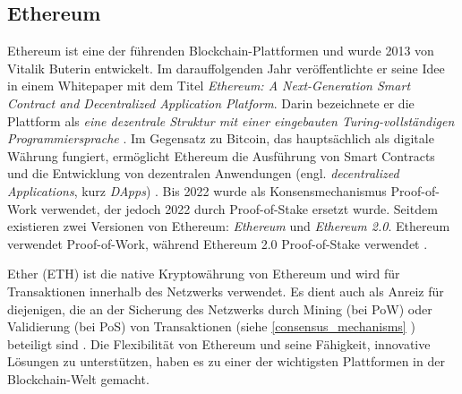 \subsection{Ethereum}
\label{sec:ethereum_basics}

Ethereum ist eine der führenden Blockchain-Plattformen und wurde 2013 von Vitalik Buterin entwickelt. Im darauffolgenden Jahr veröffentlichte er seine Idee in einem Whitepaper mit dem Titel \textit{Ethereum: A Next-Generation Smart Contract and Decentralized Application Platform}. Darin bezeichnete er die Plattform als \textit{eine dezentrale Struktur mit einer eingebauten Turing-vollständigen Programmiersprache} \parencite{Buterin_EthereumWhitepaper}. Im Gegensatz zu Bitcoin, das hauptsächlich als digitale Währung fungiert, ermöglicht Ethereum die Ausführung von Smart Contracts und die Entwicklung von dezentralen Anwendungen (engl. \textit{decentralized Applications}, kurz \textit{DApps}) \Parencites[S. 720]{Sorge_BitcoinZahlungsmittelDerZukunft}[S. 1-2]{Perez_SmartContractVulnerabilities}. Bis 2022 wurde als Konsensmechanismus Proof-of-Work verwendet, der jedoch 2022 durch Proof-of-Stake ersetzt wurde. Seitdem existieren zwei Versionen von Ethereum: \textit{Ethereum} und \textit{Ethereum 2.0}. Ethereum verwendet Proof-of-Work, während Ethereum 2.0 Proof-of-Stake verwendet \Parencite{EthereumClassic_ResearcherFAQs}.

Ether (ETH) ist die native Kryptowährung von Ethereum und wird für Transaktionen innerhalb des Netzwerks verwendet. Es dient auch als Anreiz für diejenigen, die an der Sicherung des Netzwerks durch Mining (bei PoW) oder Validierung (bei PoS) von Transaktionen (siehe \ref{consensus_mechanisms} \textit{}) beteiligt sind \parencite[S. 320-321]{Antonopoulos_MasteringEthereum}. Die Flexibilität von Ethereum und seine Fähigkeit, innovative Lösungen zu unterstützen, haben es zu einer der wichtigsten Plattformen in der Blockchain-Welt gemacht.
